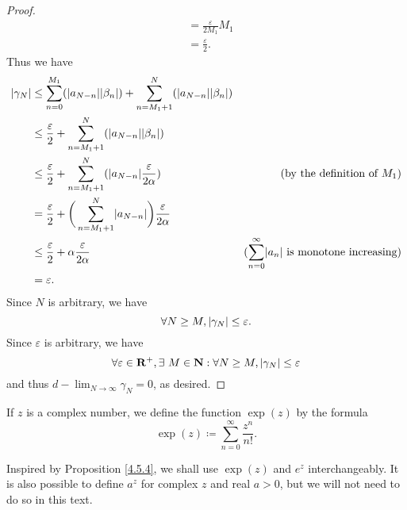 \begin{proof}
\begin{align*}
                                                           & = \frac{\varepsilon}{2 M_1} M_1                                                                                                         \\
                                                           & = \frac{\varepsilon}{2}.
    \end{align*}
    Thus we have
    \begin{align*}
        \abs{\gamma_N} & \leq \sum_{n = 0}^{M_1} (\abs{a_{N - n}} \abs{\beta_n}) + \sum_{n = M_1 + 1}^N (\abs{a_{N - n}} \abs{\beta_n})                                                                     \\
                       & \leq \frac{\varepsilon}{2} + \sum_{n = M_1 + 1}^N (\abs{a_{N - n}} \abs{\beta_n})                                                                                                  \\
                       & \leq \frac{\varepsilon}{2} + \sum_{n = M_1 + 1}^N (\abs{a_{N - n}} \frac{\varepsilon}{2 \alpha})               & \text{(by the definition of \(M_1\))}                             \\
                       & = \frac{\varepsilon}{2} + \bigg(\sum_{n = M_1 + 1}^N \abs{a_{N - n}}\bigg) \frac{\varepsilon}{2 \alpha}                                                                            \\
                       & \leq \frac{\varepsilon}{2} + \alpha \frac{\varepsilon}{2 \alpha}                                               & \text{(\(\sum_{n = 0}^\infty \abs{a_n}\) is monotone increasing)} \\
                       & = \varepsilon.
    \end{align*}
    Since \(N\) is arbitrary, we have
    \[
        \forall N \geq M, \left\lvert\gamma_N\right\rvert \leq \varepsilon.
    \]
    Since \(\varepsilon\) is arbitrary, we have
    \[
        \forall \varepsilon \in \mathbf{R}^+, \exists\ M \in \mathbf{N} : \forall N \geq M, \left\lvert\gamma_N\right\rvert \leq \varepsilon
    \]
    and thus \(d - \lim_{N \to \infty} \gamma_N = 0\), as desired.
\end{proof}

\begin{definition}\label{4.6.15}
    If \(z\) is a complex number, we define the function \(\exp(z)\) by the formula
    \[
        \exp(z) \coloneqq \sum_{n = 0}^\infty \frac{z^n}{n!}.
    \]
\end{definition}

\begin{note}
    Inspired by Proposition \ref{4.5.4}, we shall use \(\exp(z)\) and \(e^z\) interchangeably.
    It is also possible to define \(a^z\) for complex \(z\) and real \(a > 0\), but we will not need to do so in this text.
\end{note}

